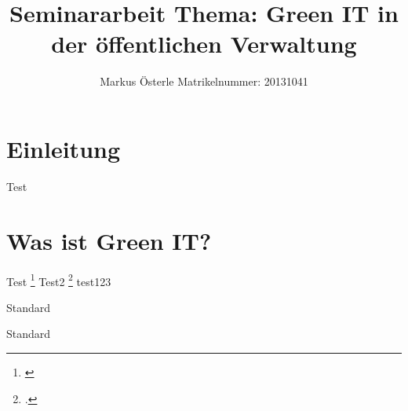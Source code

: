 \documentclass[12pt,a4paper]{report}
\author{Markus Österle \linebreak 
Matrikelnummer: 20131041}
\title{Seminararbeit \linebreak Thema: \linebreak Green IT in der öffentlichen Verwaltung}
\begin{document}
\maketitle
\tableofcontents
\newpage
\chapter{Einleitung}
Test
\chapter{Was ist Green IT?}
Test \cite{ta1} \footnote{\cite{ta1}}
\newpage
Test2 \cite{ta2} \footcite{ta1}
test123


Standard


\textsf{Standard}

\newpage
\layout
\printbibliography 
\end{document}
